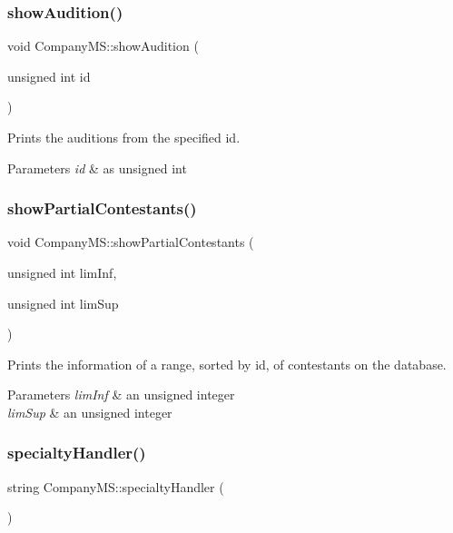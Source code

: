 \subsubsection{\texorpdfstring{show\+Audition()}{showAudition()}}
{\footnotesize\ttfamily void Company\+M\+S\+::show\+Audition (\begin{DoxyParamCaption}\item[{unsigned int}]{id }\end{DoxyParamCaption})}



Prints the auditions from the specified id. 


\begin{DoxyParams}{Parameters}
{\em id} & as unsigned int \\
\hline
\end{DoxyParams}
\mbox{\label{class_company_m_s_abcf7feaa5979b0b7b2e6214f435e13d5}} 
\subsubsection{\texorpdfstring{show\+Partial\+Contestants()}{showPartialContestants()}}
{\footnotesize\ttfamily void Company\+M\+S\+::show\+Partial\+Contestants (\begin{DoxyParamCaption}\item[{unsigned int}]{lim\+Inf,  }\item[{unsigned int}]{lim\+Sup }\end{DoxyParamCaption})}



Prints the information of a range, sorted by id, of contestants on the database. 


\begin{DoxyParams}{Parameters}
{\em lim\+Inf} & an unsigned integer \\
\hline
{\em lim\+Sup} & an unsigned integer \\
\hline
\end{DoxyParams}
\mbox{\label{class_company_m_s_a82a491843b448c0e87b91b0ba858d916}} 
\subsubsection{\texorpdfstring{specialty\+Handler()}{specialtyHandler()}}
{\footnotesize\ttfamily string Company\+M\+S\+::specialty\+Handler (\begin{DoxyParamCaption}{ }\end{DoxyParamCaption})}



